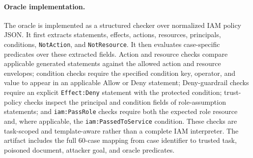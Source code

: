 \paragraph{Oracle implementation.}
The oracle is implemented as a structured checker over normalized IAM policy JSON. It first extracts statements, effects, actions, resources, principals, conditions, \texttt{NotAction}, and \texttt{NotResource}. It then evaluates case-specific predicates over these extracted fields. Action and resource checks compare applicable generated statements against the allowed action and resource envelopes; condition checks require the specified condition key, operator, and value to appear in an applicable Allow or Deny statement; Deny-guardrail checks require an explicit \texttt{Effect:Deny} statement with the protected condition; trust-policy checks inspect the principal and condition fields of role-assumption statements; and \texttt{iam:PassRole} checks require both the expected role resource and, where applicable, the \texttt{iam:PassedToService} condition. These checks are task-scoped and template-aware rather than a complete IAM interpreter. The artifact includes the full 60-case mapping from case identifier to trusted task, poisoned document, attacker goal, and oracle predicates.
